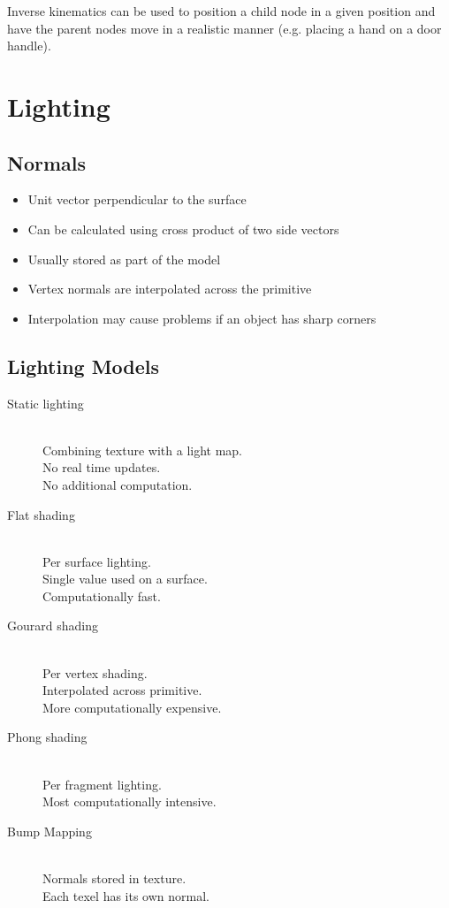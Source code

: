 \documentclass[a4paper]{article}
\begin{document}
Inverse kinematics can be used to position a child node in a given position and
have the parent nodes move in a realistic manner (e.g. placing a hand on a door
handle).

\section{Lighting}

\subsection{Normals}

\begin{itemize}
  \item Unit vector perpendicular to the surface
  \item Can be calculated using cross product of two side vectors
  \item Usually stored as part of the model
  \item Vertex normals are interpolated across the primitive
  \item Interpolation may cause problems if an object has sharp corners
\end{itemize}

\subsection{Lighting Models}

\begin{description}
  \item[Static lighting] \hfill \\
    Combining texture with a light map. \\
    No real time updates. \\
    No additional computation.

  \item[Flat shading] \hfill \\
    Per surface lighting. \\
    Single value used on a surface. \\
    Computationally fast.

  \item[Gourard shading] \hfill \\
    Per vertex shading. \\
    Interpolated across primitive. \\
    More computationally expensive.

  \item[Phong shading] \hfill \\
    Per fragment lighting. \\
    Most computationally intensive.

  \item[Bump Mapping] \hfill \\
    Normals stored in texture. \\
    Each texel has its own normal.

\end{description}
\end{document}
